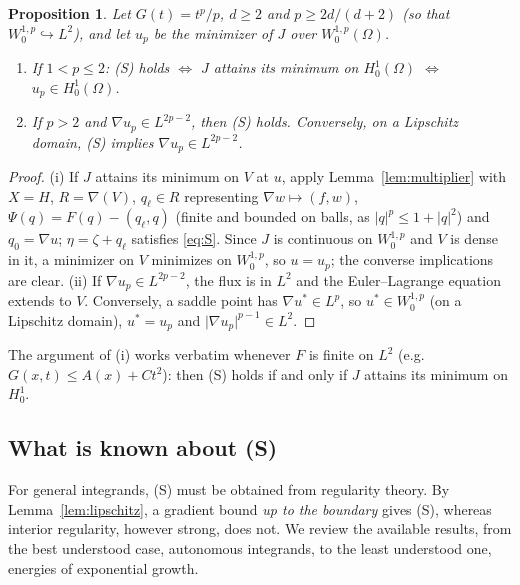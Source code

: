 \documentclass[11pt]{amsart}
\newtheorem{proposition}[theorem]{Proposition}
\theoremstyle{definition}
\theoremstyle{remark}
\numberwithin{equation}{section}
\newcommand{\abs}[1]{\lvert #1\rvert}
\begin{document}
\begin{proposition}\label{prop:S-p}
Let $G(t)=t^p/p$, $d\ge2$ and $p\ge2d/(d+2)$ \textup(so that $W^{1,p}_0\hookrightarrow L^2$\textup), and let $u_p$ be the minimizer of $J$ over $W^{1,p}_0(\Omega)$.
\begin{enumerate}[label=\textup{(\roman*)}]
\item If $1<p\le2$: \textup{(S)} holds $\iff$ $J$ attains its minimum on $H^1_0(\Omega)$ $\iff$ $u_p\in H^1_0(\Omega)$.
\item If $p>2$ and $\nabla u_p\in L^{2p-2}$, then \textup{(S)} holds. Conversely, on a Lipschitz domain, \textup{(S)} implies $\nabla u_p\in L^{2p-2}$.
\end{enumerate}
\end{proposition}
\begin{proof}
(i) If $J$ attains its minimum on $V$ at $u$, apply Lemma~\ref{lem:multiplier} with $X=H$, $R=\nabla(V)$, $q_\ell\in R$ representing $\nabla w\mapsto(f,w)$, $\Psi(q)=F(q)-(q_\ell,q)$ (finite and bounded on balls, as $\abs q^p\le1+\abs q^2$) and $q_0=\nabla u$; $\eta=\zeta+q_\ell$ satisfies \eqref{eq:S}. Since $J$ is continuous on $W^{1,p}_0$ and $V$ is dense in it, a minimizer on $V$ minimizes on $W^{1,p}_0$, so $u=u_p$; the converse implications are clear. (ii) If $\nabla u_p\in L^{2p-2}$, the flux is in $L^2$ and the Euler--Lagrange equation extends to $V$. Conversely, a saddle point has $\nabla u^*\in L^p$, so $u^*\in W^{1,p}_0$ (on a Lipschitz domain), $u^*=u_p$ and $\abs{\nabla u_p}^{p-1}\in L^2$.
\end{proof}
The argument of (i) works verbatim whenever $F$ is finite on $L^2$ (e.g.\ $G(x,t)\le A(x)+Ct^2$): then (S) holds if and only if $J$ attains its minimum on $H^1_0$.

\subsection{What is known about (S)}\label{ssec:catalogue}
For general integrands, (S) must be obtained from regularity theory. By Lemma~\ref{lem:lipschitz}, a gradient bound \emph{up to the boundary} gives (S), whereas interior regularity, however strong, does not. We review the available results, from the best understood case, autonomous integrands, to the least understood one, energies of exponential growth.
\end{document}
